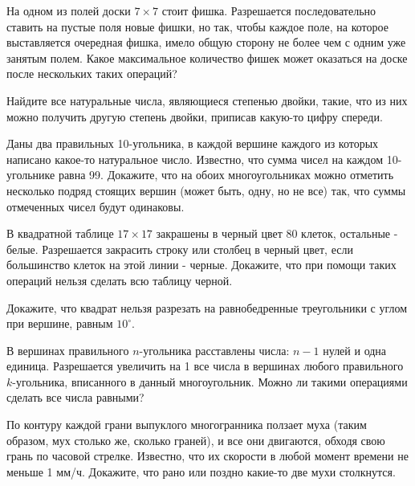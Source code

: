 \documentclass[11pt, a4paper]{problems_template}
\begin{document}
\begin{exercise}[20]
На одном из полей доски $7 \times 7$ стоит фишка. Разрешается последовательно ставить на пустые поля новые фишки, но так, чтобы каждое поле, на которое выставляется очередная фишка, имело общую сторону не более чем с одним уже занятым полем. Какое максимальное количество фишек может оказаться на доске после нескольких таких операций?
\end{exercise}

\begin{exercise}[21]
Найдите все натуральные числа, являющиеся степенью двойки, такие, что из них можно получить другую степень двойки, приписав какую-то цифру спереди.
\end{exercise}

\begin{exercise}[27]
Даны два правильных 10-угольника, в каждой вершине каждого из которых написано какое-то натуральное число. Известно, что сумма чисел на каждом 10-угольнике равна 99. Докажите, что на обоих многоугольниках можно отметить несколько подряд стоящих вершин (может быть, одну, но не все) так, что суммы отмеченных чисел будут одинаковы.
\end{exercise}

\begin{exercise}[33]
В квадратной таблице $17 \times 17$ закрашены в черный цвет 80 клеток, остальные - белые. Разрешается закрасить строку или столбец в черный цвет, если большинство клеток на этой линии - черные. Докажите, что при помощи таких операций нельзя сделать всю таблицу черной.
\end{exercise}

\begin{exercise}[45]
Докажите, что квадрат нельзя разрезать на равнобедренные треугольники с углом при вершине, равным $10^{\circ}$.
\end{exercise}

\begin{exercise}[56]
В вершинах правильного $n$-угольника расставлены числа: $n - 1$ нулей и одна единица. Разрешается увеличить на 1 все числа в вершинах любого правильного $k$-угольника, вписанного в данный многоугольник. Можно ли такими операциями сделать все числа равными?
\end{exercise}

\begin{exercise}[64]
По контуру каждой грани выпуклого многогранника ползает муха (таким образом, мух столько же, сколько граней), и все они двигаются, обходя свою грань по часовой стрелке. Известно, что их скорости в любой момент времени не меньше 1 мм/ч. Докажите, что рано или поздно какие-то две мухи столкнутся.
\end{exercise}
\end{document}
